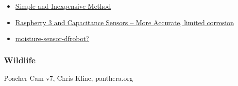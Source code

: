 \documentclass{article}\usepackage[]{graphicx}\usepackage[]{color}
\begin{document}
\begin{itemize}

\item \href{https://tutorials-raspberrypi.com/measuring-soil-moisture-with-raspberry-pi/}{Simple and Inexpensive Method}

\item \href{moisture-sensor-dfrobothttps://www.switchdoc.com/2018/11/tutorial-capacitive-moisture-sensor-grove/}{Raspberry 3 and Capacitance Sensors -- More Accurate, limited corrosion}

\item \href{https://tutorials-raspberrypi.com/raspberry-pi-capacitive-spoil-moisture-sensor-dfrobot-gravity/}{moisture-sensor-dfrobot?}
\end{itemize}

\subsubsection{Wildlife}

Poacher Cam v7, Chris Kline, panthera.org
\end{document}
